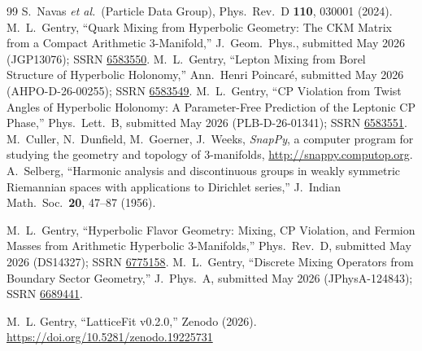 \documentclass[11pt,a4paper]{article}
\begin{document}
\begin{thebibliography}{99}
  S.~Navas \textit{et al.}\ (Particle Data Group),
  Phys.\ Rev.\ D \textbf{110}, 030001 (2024).
  M.~L.~Gentry,
  ``Quark Mixing from Hyperbolic Geometry: The CKM Matrix from a Compact
  Arithmetic 3-Manifold,''
  J.\ Geom.\ Phys., submitted May 2026 (JGP13076);
  SSRN \href{https://doi.org/10.2139/ssrn.6583550}{6583550}.
  M.~L.~Gentry,
  ``Lepton Mixing from Borel Structure of Hyperbolic Holonomy,''
  Ann.\ Henri Poincar\'e, submitted May 2026 (AHPO-D-26-00255);
  SSRN \href{https://doi.org/10.2139/ssrn.6583549}{6583549}.
  M.~L.~Gentry,
  ``CP Violation from Twist Angles of Hyperbolic Holonomy:
  A Parameter-Free Prediction of the Leptonic CP Phase,''
  Phys.\ Lett.\ B, submitted May 2026 (PLB-D-26-01341);
  SSRN \href{https://doi.org/10.2139/ssrn.6583551}{6583551}.
  M.~Culler, N.~Dunfield, M.~Goerner, J.~Weeks,
  \textit{SnapPy}, a computer program for studying the geometry and topology
  of 3-manifolds, \url{http://snappy.computop.org}.
  A.~Selberg,
  ``Harmonic analysis and discontinuous groups in weakly symmetric Riemannian
  spaces with applications to Dirichlet series,''
  J.\ Indian Math.\ Soc.\ \textbf{20}, 47--87 (1956).

  M.~L.~Gentry,
  ``Hyperbolic Flavor Geometry: Mixing, CP Violation, and Fermion Masses
  from Arithmetic Hyperbolic 3-Manifolds,''
  Phys.\ Rev.\ D, submitted May 2026 (DS14327);
  SSRN \href{https://doi.org/10.2139/ssrn.6775158}{6775158}.
  M.~L.~Gentry,
  ``Discrete Mixing Operators from Boundary Sector Geometry,''
  J.\ Phys.\ A, submitted May 2026 (JPhysA-124843);
  SSRN \href{https://doi.org/10.2139/ssrn.6689441}{6689441}.

M.~L. Gentry,
``LatticeFit v0.2.0,''
Zenodo (2026).
\url{https://doi.org/10.5281/zenodo.19225731}
\end{thebibliography}
\end{document}
